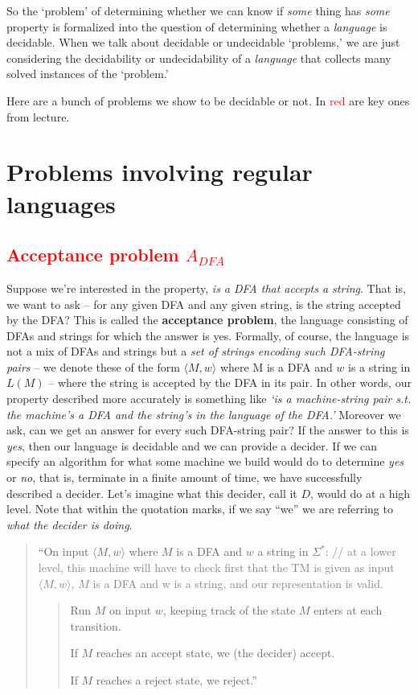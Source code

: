 \documentclass[11pt]{article}
\begin{document}
So the `problem' of determining whether we can know if \emph{some} thing has \emph{some} property is formalized into the question of determining whether a \emph{language} is decidable. When we talk about decidable or undecidable `problems,' we are just considering the decidability or undecidability of a \emph{language} that collects many solved instances of the `problem.'

\newpage
Here are a bunch of problems we show to be decidable or not. In \textcolor{red}{red} are key ones from lecture.
\section{Problems involving regular languages}
\subsection{\textcolor{red}{Acceptance problem $A_{DFA}$}}
Suppose we’re interested in the property, \emph{is a DFA that accepts a string}. That is, we want to ask – for any given DFA and any given string, is the string accepted by the DFA? This is called the \textbf{acceptance problem}, the language consisting of DFAs and strings for which the answer is yes. Formally, of course, the language is not a mix of DFAs and strings but a \emph{set of strings encoding such DFA-string pairs} – we denote these of the form $\langle M, w \rangle$ where M is a DFA and $w$ is a string in $L(M)$ – where the string is accepted by the DFA in its pair. In other words, our property described more accurately is something like \emph{‘is a machine-string pair s.t. the machine’s a DFA and the string’s in the language of the DFA.’} Moreover we ask, can we get an answer for every such DFA-string pair? If the answer to this is \emph{yes}, then our language is decidable and we can provide a decider. If we can specify an algorithm for what some machine we build would do to determine \emph{yes} or \emph{no}, that is, terminate in a finite amount of time, we have successfully described a decider. Let’s imagine what this decider, call it $D$, would do at a high level. Note that within the quotation marks, if we say ``we” we are referring to \emph{what the decider is doing}.
\begin{quote}
``On input $\langle M, w \rangle$ where $M$ is a DFA and $w$ a string in $\Sigma^*$: \textcolor{gray}{// at a lower level, this machine will have to check first that the TM is given as input $\langle M, w \rangle$, $M$ is a DFA and w is a string, and our representation is valid.}
\begin{quote}Run $M$ on input $w$, keeping track of the state $M$ enters at each transition.

If $M$ reaches an accept state, we (the decider) accept.

If $M$ reaches a reject state, we reject.”
\end{quote}
\end{quote}
\end{document}
